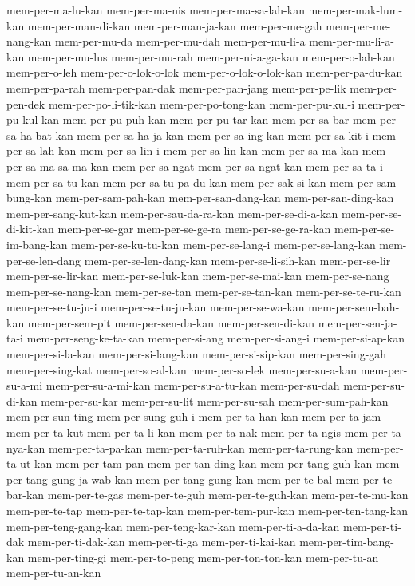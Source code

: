 {mem-per-ma-lu-kan mem-per-ma-nis mem-per-ma-sa-lah-kan mem-per-mak-lum-kan
mem-per-man-di-kan mem-per-man-ja-kan mem-per-me-gah mem-per-me-nang-kan
mem-per-mu-da mem-per-mu-dah mem-per-mu-li-a mem-per-mu-li-a-kan
mem-per-mu-lus mem-per-mu-rah mem-per-ni-a-ga-kan mem-per-o-lah-kan
mem-per-o-leh mem-per-o-lok-o-lok mem-per-o-lok-o-lok-kan
mem-per-pa-du-kan mem-per-pa-rah mem-per-pan-dak mem-per-pan-jang
mem-per-pe-lik mem-per-pen-dek mem-per-po-li-tik-kan mem-per-po-tong-kan
mem-per-pu-kul-i mem-per-pu-kul-kan mem-per-pu-puh-kan mem-per-pu-tar-kan
mem-per-sa-bar mem-per-sa-ha-bat-kan mem-per-sa-ha-ja-kan
mem-per-sa-ing-kan mem-per-sa-kit-i mem-per-sa-lah-kan mem-per-sa-lin-i
mem-per-sa-lin-kan mem-per-sa-ma-kan mem-per-sa-ma-sa-ma-kan
mem-per-sa-ngat mem-per-sa-ngat-kan mem-per-sa-ta-i mem-per-sa-tu-kan
mem-per-sa-tu-pa-du-kan mem-per-sak-si-kan mem-per-sam-bung-kan
mem-per-sam-pah-kan mem-per-san-dang-kan mem-per-san-ding-kan
mem-per-sang-kut-kan mem-per-sau-da-ra-kan mem-per-se-di-a-kan
mem-per-se-di-kit-kan mem-per-se-gar mem-per-se-ge-ra mem-per-se-ge-ra-kan
mem-per-se-im-bang-kan mem-per-se-ku-tu-kan mem-per-se-lang-i
mem-per-se-lang-kan mem-per-se-len-dang mem-per-se-len-dang-kan
mem-per-se-li-sih-kan mem-per-se-lir mem-per-se-lir-kan mem-per-se-luk-kan
mem-per-se-mai-kan mem-per-se-nang mem-per-se-nang-kan mem-per-se-tan
mem-per-se-tan-kan mem-per-se-te-ru-kan mem-per-se-tu-ju-i
mem-per-se-tu-ju-kan mem-per-se-wa-kan mem-per-sem-bah-kan mem-per-sem-pit
mem-per-sen-da-kan mem-per-sen-di-kan mem-per-sen-ja-ta-i
mem-per-seng-ke-ta-kan mem-per-si-ang mem-per-si-ang-i mem-per-si-ap-kan
mem-per-si-la-kan mem-per-si-lang-kan mem-per-si-sip-kan mem-per-sing-gah
mem-per-sing-kat mem-per-so-al-kan mem-per-so-lek mem-per-su-a-kan
mem-per-su-a-mi mem-per-su-a-mi-kan mem-per-su-a-tu-kan mem-per-su-dah
mem-per-su-di-kan mem-per-su-kar mem-per-su-lit mem-per-su-sah
mem-per-sum-pah-kan mem-per-sun-ting mem-per-sung-guh-i mem-per-ta-han-kan
mem-per-ta-jam mem-per-ta-kut mem-per-ta-li-kan mem-per-ta-nak
mem-per-ta-ngis mem-per-ta-nya-kan mem-per-ta-pa-kan mem-per-ta-ruh-kan
mem-per-ta-rung-kan mem-per-ta-ut-kan mem-per-tam-pan mem-per-tan-ding-kan
mem-per-tang-guh-kan mem-per-tang-gung-ja-wab-kan mem-per-tang-gung-kan
mem-per-te-bal mem-per-te-bar-kan mem-per-te-gas mem-per-te-guh
mem-per-te-guh-kan mem-per-te-mu-kan mem-per-te-tap mem-per-te-tap-kan
mem-per-tem-pur-kan mem-per-ten-tang-kan mem-per-teng-gang-kan
mem-per-teng-kar-kan mem-per-ti-a-da-kan mem-per-ti-dak mem-per-ti-dak-kan
mem-per-ti-ga mem-per-ti-kai-kan mem-per-tim-bang-kan mem-per-ting-gi
mem-per-to-peng mem-per-ton-ton-kan mem-per-tu-an mem-per-tu-an-kan
}
